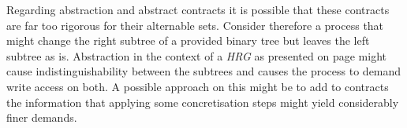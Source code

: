 	Regarding abstraction and abstract contracts it is possible that these
	contracts are far too rigorous for their alternable sets. Consider therefore
	a process that might change the right subtree of a provided binary tree
	but leaves the left subtree as is. Abstraction in the context of a
	\emph{\ac{HRG}} as presented on page \pageref{eq:G} might cause
	indistinguishability between the subtrees and causes the process to demand
	write access on both. A possible approach on this might be to add
	to contracts the information that applying some concretisation steps might
	yield considerably finer demands.
